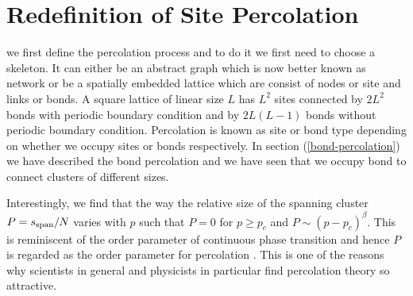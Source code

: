 \section{Redefinition of Site Percolation}
	\label{sect.redefinition-site-percolation}
	we first define the percolation process and to do it
	we first need to choose a skeleton. It can either be an abstract graph which is now
	better known as network or be a spatially embedded lattice
	which are consist of nodes or site and links or bonds.  
	A square lattice of linear size $L$ has 
	$L^2$ sites connected by $2L^2$  bonds with periodic boundary condition and by
	$2L(L-1)$ bonds without periodic boundary condition. Percolation 
	is known as site or bond type depending on whether we occupy sites or bonds respectively.
	In section (\ref{bond-percolation}) we have described the bond percolation and we have seen that we occupy bond to connect clusters of different sizes.

	
	Interestingly, we find that the way the 
	relative size of the spanning cluster $P=s_{{\rm span}}/N$ varies 
	with $p$ such that $P=0$ for $p\geq p_c$ and $P\sim (p-p_c)^\beta$. This is reminiscent of the order parameter of continuous phase transition
	and hence $P$ is regarded as the order parameter for percolation \cite{Stanley1987, Binney1992}.
	This is one of the reasons why scientists in general and physicists in particular find percolation theory so attractive. 
	
	
	
